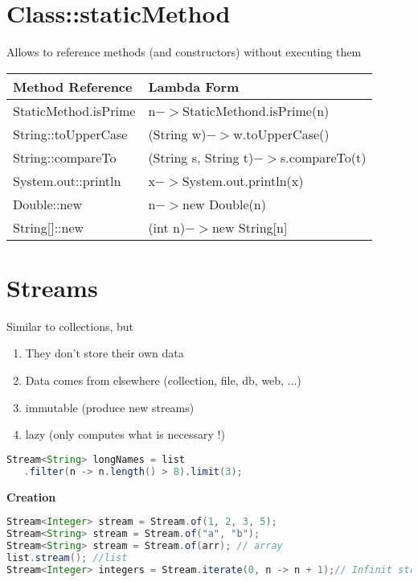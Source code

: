 \section{Class::staticMethod}

Allows to reference methods (and constructors) without executing them

\begin{tabular}{@{}l|l@{}}
    \hline
    {Method Reference}     & {Lambda Form} \\
    \hline
    {StaticMethod.isPrime} & {n$->$StaticMethond.isPrime(n)} \\
    \hline
    {String::toUpperCase}  & {(String w)$->$w.toUpperCase()} \\
    \hline
    {String::compareTo}    & {(String s, String t)$->$s.compareTo(t)}\\
    \hline
    {System.out::println}  & {x$->$System.out.println(x)}\\
    \hline
    {Double::new}          & {n$->$new Double(n)}\\
    \hline
    {String[]::new}        & {(int n)$->$new String[n]}\\
    \hline
\end{tabular}

\section{Streams}

Similar to collections, but
\begin{enumerate}
        \item{They don't store their own data}
        \item{Data comes from elsewhere (collection, file, db, web, ...)}
        \item{immutable (produce new streams)}
        \item{lazy (only computes what is necessary !)}
\end{enumerate}

\begin{lstlisting}[language=Java]
Stream<String> longNames = list
   .filter(n -> n.length() > 8).limit(3);
\end{lstlisting}

\textbf{Creation}
\begin{lstlisting}[language=Java]
Stream<Integer> stream = Stream.of(1, 2, 3, 5);
Stream<String> stream = Stream.of("a", "b");
Stream<String> stream = Stream.of(arr); // array
list.stream(); //list
Stream<Integer> integers = Stream.iterate(0, n -> n + 1);// Infinit stream [0; inf[
\end{lstlisting}

